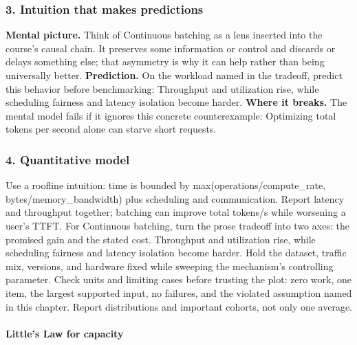 \subsubsection*{3. Intuition that makes predictions}
\textbf{Mental picture.} Think of Continuous batching as a lens inserted into the course's causal chain. It preserves some information or control and discards or delays something else; that asymmetry is why it can help rather than being universally better.
\textbf{Prediction.} On the workload named in the tradeoff, predict this behavior before benchmarking: Throughput and utilization rise, while scheduling fairness and latency isolation become harder.
\textbf{Where it breaks.} The mental model fails if it ignores this concrete counterexample: Optimizing total tokens per second alone can starve short requests.
\subsubsection*{4. Quantitative model}
Use a roofline intuition: time is bounded by max(operations/compute\_rate, bytes/memory\_bandwidth) plus scheduling and communication. Report latency and throughput together; batching can improve total tokens/s while worsening a user's TTFT.
For Continuous batching, turn the prose tradeoff into two axes: the promised gain and the stated cost. Throughput and utilization rise, while scheduling fairness and latency isolation become harder. Hold the dataset, traffic mix, versions, and hardware fixed while sweeping the mechanism's controlling parameter.
Check units and limiting cases before trusting the plot: zero work, one item, the largest supported input, no failures, and the violated assumption named in this chapter. Report distributions and important cohorts, not only one average.
\paragraph{Little's Law for capacity}
